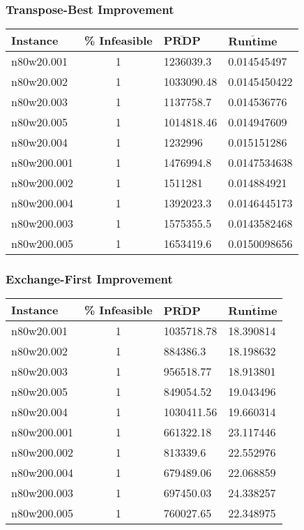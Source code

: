 \begin{homeworkProblem}
\subsubsection{Transpose-Best Improvement}
\begin{center}
\begin{tabular}{|l|c|l|l|}
\hline
\textbf{Instance}& \textbf{\% Infeasible} & $\mathbf{\bar{PRDP}}$ &$\mathbf{\bar{Runtime}}$\\
\hline
n80w20.001&1&1236039.3&0.014545497\\
\hline
n80w20.002&1&1033090.48&0.0145450422\\
\hline
n80w20.003&1&1137758.7&0.014536776\\
\hline
n80w20.005&1&1014818.46&0.014947609\\
\hline
n80w20.004&1&1232996&0.015151286\\
\hline
n80w200.001&1&1476994.8&0.0147534638\\
\hline
n80w200.002&1&1511281&0.014884921\\
\hline
n80w200.004&1&1392023.3&0.0146445173\\
\hline
n80w200.003&1&1575355.5&0.0143582468\\
\hline
n80w200.005&1&1653419.6&0.0150098656\\
\hline
\end{tabular}
\label{tab:t.b}
\end{center}

\subsubsection{Exchange-First Improvement}
\begin{center}
\begin{tabular}{|l|c|l|l|}
\hline
\textbf{Instance}& \textbf{\% Infeasible} & $\mathbf{\bar{PRDP}}$ &$\mathbf{\bar{Runtime}}$\\
\hline
n80w20.001&1&1035718.78&18.390814\\
\hline
n80w20.002&1&884386.3&18.198632\\
\hline
n80w20.003&1&956518.77&18.913801\\
\hline
n80w20.005&1&849054.52&19.043496\\
\hline
n80w20.004&1&1030411.56&19.660314\\
\hline
n80w200.001&1&661322.18&23.117446\\
\hline
n80w200.002&1&813339.6&22.552976\\
\hline
n80w200.004&1&679489.06&22.068859\\
\hline
n80w200.003&1&697450.03&24.338257\\
\hline
n80w200.005&1&760027.65&22.348975\\
\hline
\end{tabular}
\label{tab:e.f}
\end{center}


\end{homeworkProblem}
